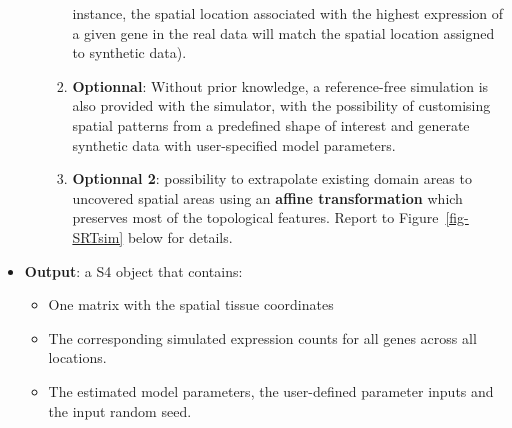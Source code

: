 \documentclass[
  letterpaper,
]{book}
\providecommand{\tightlist}{%
  \setlength{\itemsep}{0pt}\setlength{\parskip}{0pt}}\usepackage{longtable,booktabs,array}
\begin{document}
\begin{itemize}
\begin{itemize}
\begin{enumerate}
      instance, the spatial location associated with the highest
      expression of a given gene in the real data will match the spatial
      location assigned to synthetic data).
    \item
      \textbf{Optionnal}: Without prior knowledge, a reference-free
      simulation is also provided with the simulator, with the
      possibility of customising spatial patterns from a predefined
      shape of interest and generate synthetic data with user-specified
      model parameters.
    \item
      \textbf{Optionnal 2}: possibility to extrapolate existing domain
      areas to uncovered spatial areas using an \textbf{affine
      transformation} which preserves most of the topological features.
      Report to Figure~\ref{fig-SRTsim} below for details.
    \end{enumerate}
  \end{itemize}
\item
  \textbf{Output}: a S4 object that contains:

  \begin{itemize}
  \tightlist
  \item
    One matrix with the spatial tissue coordinates
  \item
    The corresponding simulated expression counts for all genes across
    all locations.
  \item
    The estimated model parameters, the user-defined parameter inputs
    and the input random seed.
  \end{itemize}
\end{itemize}
\end{document}
